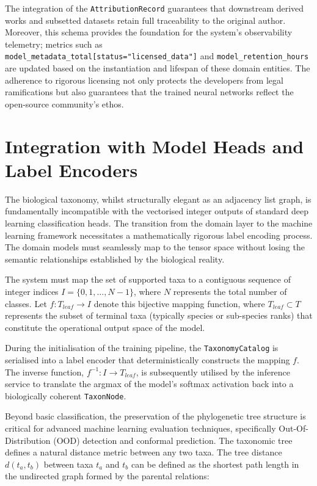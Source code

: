 The integration of the \texttt{AttributionRecord} guarantees that downstream derived works and subsetted datasets retain full traceability to the original author. Moreover, this schema provides the foundation for the system's observability telemetry; metrics such as\\\texttt{model\_metadata\_total[status="licensed\_data"]} and \texttt{model\_retention\_hours} are updated based on the instantiation and lifespan of these domain entities. The adherence to rigorous licensing not only protects the developers from legal ramifications but also guarantees that the trained neural networks reflect the open-source community's ethos.

\section{Integration with Model Heads and Label Encoders}
\label{sec:integration_model_heads}

The biological taxonomy, whilst structurally elegant as an adjacency list graph, is fundamentally incompatible with the vectorised integer outputs of standard deep learning classification heads. The transition from the domain layer to the machine learning framework necessitates a mathematically rigorous label encoding process. The domain models must seamlessly map to the tensor space without losing the semantic relationships established by the biological reality.

The system must map the set of supported taxa to a contiguous sequence of integer indices $I = \{0, 1, \dots, N-1\}$, where $N$ represents the total number of classes. Let $f: T_{leaf} \rightarrow I$ denote this bijective mapping function, where $T_{leaf} \subset T$ represents the subset of terminal taxa (typically species or sub-species ranks) that constitute the operational output space of the model.

During the initialisation of the training pipeline, the \texttt{TaxonomyCatalog} is serialised into a label encoder that deterministically constructs the mapping $f$. The inverse function, $f^{-1}: I \rightarrow T_{leaf}$, is subsequently utilised by the inference service to translate the argmax of the model's softmax activation back into a biologically coherent \texttt{TaxonNode}.

Beyond basic classification, the preservation of the phylogenetic tree structure is critical for advanced machine learning evaluation techniques, specifically Out-Of-Distribution (OOD) detection and conformal prediction. The taxonomic tree defines a natural distance metric between any two taxa. The tree distance $d(t_a, t_b)$ between taxa $t_a$ and $t_b$ can be defined as the shortest path length in the undirected graph formed by the parental relations:

